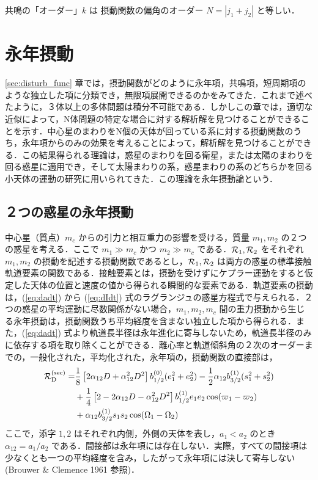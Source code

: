 \documentclass[11pt,a4paper,oneside,onecolumn]{jreport}
\begin{document}
共鳴の「オーダー」$k$ は 摂動関数の偏角のオーダー $N = |j_1 + j_2|$ と等しい．

\section{永年摂動}
\ref{sec:disturb_func} 章では，摂動関数がどのように永年項，共鳴項，短周期項のような独立した項に分類でき，無限項展開できるのかをみてきた．これまで述べたように，３体以上の多体問題は積分不可能である．しかしこの章では，適切な近似によって，N体問題の特定な場合に対する解析解を見つけることができることを示す．中心星のまわりをN個の天体が回っている系に対する摂動関数のうち，永年項からのみの効果を考えることによって，解析解を見つけることができる．この結果得られる理論は，惑星のまわりを回る衛星，または太陽のまわりを回る惑星に適用でき，そして太陽まわりの系，惑星まわりの系のどちらかを回る小天体の運動の研究に用いられてきた．この理論を永年摂動論という．

\subsection{２つの惑星の永年摂動 \label{sec:2planet}}
中心星（質点）$m_c$ からの引力と相互重力の影響を受ける，質量 $m_1, m_2$ の２つの惑星を考える．ここで $m_1 \gg m_c$ かつ $m_2 \gg m_c$ である．${\cal R}_1, {\cal R}_2$ をそれぞれ $m_1, m_2$ の摂動を記述する摂動関数であるとし，${\cal R}_1, {\cal R}_2$ は両方の惑星の標準接触軌道要素の関数である．接触要素とは，摂動を受けずにケプラー運動をすると仮定した天体の位置と速度の値から得られる瞬間的な要素である．軌道要素の摂動は，(\ref{eq:dadt}) から (\ref{eq:dIdt}) 式のラグランジュの惑星方程式で与えられる．２つの惑星の平均運動に尽数関係がない場合，$m_1, m_2, m_c$ 間の重力摂動から生じる永年摂動は，摂動関数うち平均経度を含まない独立した項から得られる．また，(\ref{eq:dadt}) 式より軌道長半径は永年進化に寄与しないため，軌道長半径のみに依存する項を取り除くことができる．離心率と軌道傾斜角の２次のオーダーまでの，一般化された，平均化された，永年項の，摂動関数の直接部は，
\begin{equation}
\begin{split}
{\cal R}_{\rm D}^{\rm (sec)} = & \frac{1}{8} \left[ 2 \alpha_{12} D + \alpha_{12}^2 D^2 \right] b_{1/2}^{(0)} (e_1^2 + e_2^2) - \frac{1}{2} \alpha_{12} b_{3/2}^{(1)} (s_1^2 + s_2^2) \\
& + \frac{1}{4} \left[ 2 - 2 \alpha_{12} D - \alpha_{12}^2 D^2 \right] b_{1/2}^{(1)} e_1 e_2 \cos (\varpi_1 - \varpi_2) \\
& + \alpha_{12} b_{3/2}^{(1)} s_1 s_2 \cos (\Omega_1 - \Omega_2) \\
\end{split} \label{}
\end{equation}
ここで，添字 $1,2$ はそれぞれ内側，外側の天体を表し，$a_1 < a_2$ のとき $\alpha_{12} = a_1 / a_2$ 
である．間接部は永年項には存在しない．実際，すべての間接項は少なくとも一つの平均経度を含み，したがって永年項には決して寄与しない (Brouwer \& Clemence 1961 参照)．
\end{document}
